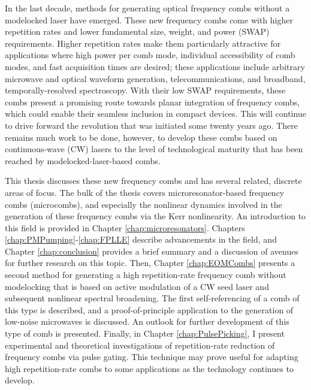 In the last decade, methods for generating optical frequency combs without a modelocked laser have emerged. These new frequency combs come with higher repetition rates and lower fundamental size, weight, and power (SWAP) requirements. Higher repetition rates make them particularly attractive for applications where high power per comb mode, individual accessibility of comb modes, and fast acquisition times are desired; these applications include arbitrary microwave and optical waveform generation, telecommunications, and broadband, temporally-resolved spectroscopy. With their low SWAP requirements, these combs present a promising route towards planar integration of frequency combs, which could enable their seamless inclusion in compact devices. This will continue to drive forward the revolution that was initiated some twenty years ago. There remains much work to be done, however, to develop these combs based on continuous-wave (CW) lasers to the level of technological maturity that has been reached by modelocked-laser-based combs.




This thesis discusses these new frequency combs and has several related, discrete areas of focus. The bulk of the thesis covers microresonator-based frequency combs (microcombs), and especially the nonlinear dynamics involved in the generation of these frequency combs via the Kerr nonlinearity. An introduction to this field is provided in Chapter \ref{chap:microresonators}. Chapters \ref{chap:PMPumping}-\ref{chap:FPLLE} describe advancements in the field, and Chapter \ref{chap:conclusion} provides a brief summary and a discussion of avenues for further research on this topic. Then, Chapter \ref{chap:EOMCombs} presents a second method for generating a high repetition-rate frequency comb without modelocking that is based on active modulation of a CW seed laser and subsequent nonlinear spectral broadening. The first self-referencing of a comb of this type is described, and a proof-of-principle application to the generation of low-noise microwaves is discussed. An outlook for further development of this type of comb is presented. Finally, in Chapter \ref{chap:PulsePicking}, I present experimental and theoretical investigations of repetition-rate reduction of frequency combs via pulse gating. This technique may prove useful for adapting high repetition-rate combs to some applications as the technology continues to develop. 

